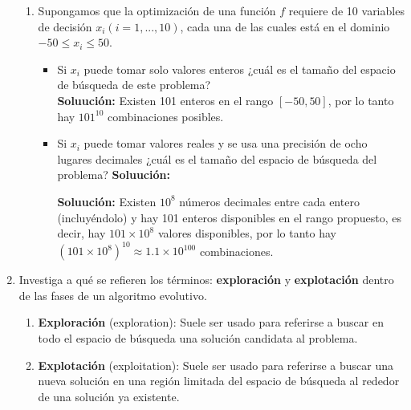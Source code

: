 \documentclass[10pt,letterpaper]{article}
\begin{document}
\begin{enumerate}
\begin{enumerate}
                \item Supongamos que la optimización de una función $f$ requiere de
                      10 variables de decisión $x_i(i = 1,...,10)$, cada una de las
                      cuales está en el dominio $-50 \leq x_i \leq 50$.
                      \begin{itemize}
                        \item Si $x_i$ puede tomar solo valores enteros ¿cuál
                              es el tamaño del espacio de búsqueda de este problema? \\

                              \textbf{Soluución:}
                              Existen 101 enteros en el rango $[-50, 50]$, por lo tanto
                              hay $101^{10}$ combinaciones posibles. \\

                        \item Si $x_i$ puede tomar valores reales y se usa
                              una precisión de ocho lugares decimales ¿cuál
                              es el tamaño del espacio de búsqueda del problema?
                              \textbf{Soluución:}

                              \textbf{Soluución:}
                              Existen $10^8$ números decimales entre cada entero
                              (incluyéndolo) y hay 101 enteros disponibles en el
                              rango propuesto, es decir, hay $101 \times 10^8$
                              valores disponibles, por lo tanto hay 
                              $(101 \times 10^8)^{10} \approx 1.1 \times 10^{100}$
                              combinaciones.
                      \end{itemize}
            \end{enumerate}

        \item Investiga a qué se refieren los términos: \textbf{exploración}
              y \textbf{explotación} dentro de las fases de un algoritmo evolutivo. \\
        
            \begin{enumerate}
                \item \textbf{Exploración} (exploration): Suele ser usado para
                      referirse a buscar en todo el espacio de búsqueda una
                      solución candidata al problema.
                \item \textbf{Explotación} (exploitation): Suele ser usado para
                      referirse a buscar una nueva solución en una región limitada
                      del espacio de búsqueda al rededor de una solución ya existente.
            \end{enumerate}


\end{enumerate}
\end{document}

